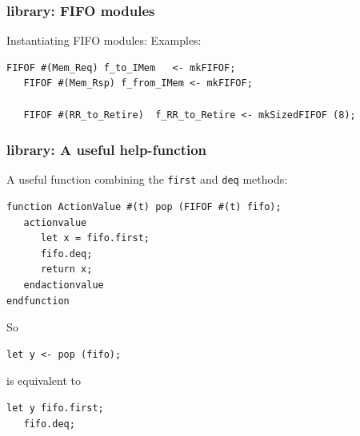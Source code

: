 
\begin{frame}[fragile]
\frametitle{{\BSV} library: FIFO modules}

\footnotesize

Instantiating FIFO modules: Examples:
\begin{Verbatim}[frame=single]
   FIFOF #(Mem_Req) f_to_IMem   <- mkFIFOF;
   FIFOF #(Mem_Rsp) f_from_IMem <- mkFIFOF;

   FIFOF #(RR_to_Retire)  f_RR_to_Retire <- mkSizedFIFOF (8);
\end{Verbatim}

\end{frame}


\begin{frame}[fragile]
\frametitle{{\BSV} library: A useful help-function}

\footnotesize

A useful function combining the {\tt first} and {\tt deq} methods:
\begin{Verbatim}[frame=single]
function ActionValue #(t) pop (FIFOF #(t) fifo);
   actionvalue
      let x = fifo.first;
      fifo.deq;
      return x;
   endactionvalue
endfunction
\end{Verbatim}

\vspace{4ex}

\begin{center}
So \hmm
\begin{minipage}{0.3\textwidth}
\begin{Verbatim}[frame=single]
   let y <- pop (fifo);
\end{Verbatim}
\end{minipage}
\hmm is equivalent to \hmm
\begin{minipage}{0.3\textwidth}
\begin{Verbatim}[frame=single]
   let y fifo.first;
   fifo.deq;
\end{Verbatim}
\end{minipage}
\end{center}

\end{frame}


